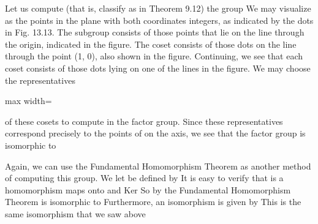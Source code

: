 \documentclass[11pt,oneside]{article}
\begin{document}
\begin{BookBody}

 Let us compute (that is, classify as in Theorem 9.12) the group  We may visualize  as the points in the plane with both coordinates integers, as indicated by the dots in Fig. 13.13. The subgroup  consists of those points that lie on the  line through the origin, indicated in the figure. The coset  consists of those dots on the  line through the point (1, 0), also shown in the figure. Continuing, we see that each coset consists of those dots lying on one of the  lines in the figure. We may choose the representatives

\begin{center}\begin{adjustbox}{max width=\linewidth}\end{adjustbox}\end{center}

\noindent of these cosets to compute in the factor group. Since these representatives correspond precisely to the points of  on the axis, we see that the factor group  is isomorphic to 

Again, we can use the Fundamental Homomorphism Theorem as another method of computing this group. We let  be defined by  It is easy to verify that \BookInline{\phi } is a homomorphism\BookInline{,\allowbreak \phi } maps onto  and Ker\BookInline{(\phi )= }  So by the Fundamental Homomorphism Theorem is isomorphic to  Furthermore, an isomorphism is given by  This is the same isomorphism that we saw above\BookEnd{\blacktriangle}


\end{BookBody}
\end{document}
